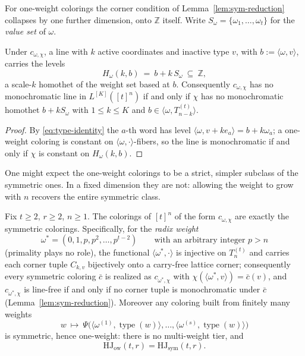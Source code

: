 \documentclass[12pt]{article}
\newcommand{\HJ}{\mathrm{HJ}}
\newcommand{\Z}{\mathbb{Z}}
\newcommand{\Ls}{L}
\DeclareMathOperator{\type}{type}
\begin{document}
For one-weight colorings the corner condition of
Lemma~\ref{lem:sym-reduction} collapses by one further dimension, onto
$\Z$ itself. Write $S_{\omega}=\{\omega_{1},\dots,\omega_{t}\}$ for the
\emph{value set} of $\omega$.

\begin{lemma}\label{lem:pattern}
Under $c_{\omega,\chi}$, a line with $k$ active coordinates and
inactive type $v$, with $b:=\langle\omega,v\rangle$, carries the levels
\[
H_{\omega}(k,b)\ =\ b+k\,S_{\omega}\ \subseteq\ \Z,
\]
a scale-$k$ homothet of the weight set based at $b$. Consequently
$c_{\omega,\chi}$ has no monochromatic line in $\Ls^{[K]}([t]^{n})$ if
and only if $\chi$ has no monochromatic homothet $b+kS_{\omega}$ with
$1\le k\le K$ and $b\in\langle\omega,T_{n-k}^{(t)}\rangle$.
\end{lemma}

\begin{proof}
By \eqref{eq:type-identity} the $a$-th word has level
$\langle\omega,v+ke_{a}\rangle=b+k\omega_{a}$; a one-weight coloring is
constant on $\langle\omega,\cdot\rangle$-fibers, so the line is
monochromatic if and only if $\chi$ is constant on $H_{\omega}(k,b)$.
\end{proof}

One might expect the one-weight colorings to be a strict, simpler
subclass of the symmetric ones. In a fixed dimension they are not:
allowing the weight to grow with $n$ recovers the entire symmetric
class.

\begin{theorem}[{One-weight $=$ symmetric; the rank hierarchy is flat}]\label{thm:radix}
Fix $t\ge 2$, $r\ge 2$, $n\ge 1$. The colorings of $[t]^{n}$ of the
form $c_{\omega,\chi}$ are exactly the symmetric colorings.
Specifically, for the \emph{radix weight}
\[
\omega^{\ast}=(0,1,p,p^{2},\dots,p^{t-2})
\qquad\text{with an arbitrary integer } p>n
\]
\textup{(}primality plays no role\textup{)}, the functional
$\langle\omega^{\ast},\cdot\rangle$ is injective on $T_{n}^{(t)}$ and
carries each corner tuple $C_{k,v}$ bijectively onto a carry-free
lattice corner; consequently every symmetric coloring $\bar c$ is
realized as $c_{\omega^{\ast},\chi}$ with
$\chi(\langle\omega^{\ast},v\rangle)=\bar c(v)$, and
$c_{\omega^{\ast},\chi}$ is line-free if and only if no corner tuple is
monochromatic under $\bar c$ (Lemma~\ref{lem:sym-reduction}). Moreover
any coloring built from finitely many weights
\[
w\ \longmapsto\ \Psi\bigl(\langle\omega^{(1)},\type(w)\rangle,\dots,
\langle\omega^{(s)},\type(w)\rangle\bigr)
\]
is symmetric, hence one-weight: there is no multi-weight tier, and
\[
\HJ_{\mathrm{ow}}(t,r)=\HJ_{\mathrm{sym}}(t,r).
\]
\end{theorem}
\end{document}
